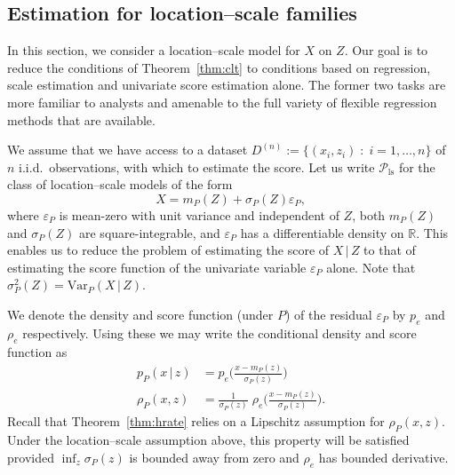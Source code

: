 \documentclass[aos]{imsart}
\newcommand{\R}{\mathbb{R}}
\newcommand{\Var}{\mathrm{Var}}
\newcommand{\given}{\,|\,}
\begin{document}
	
	
	\subsection{Estimation for location--scale families}
	\label{sect:scorelsfamilies}
	In this section, we consider  a location--scale model for $X$ on $Z$.
	Our goal is to reduce the conditions of Theorem~\ref{thm:clt} to conditions based on regression, scale estimation and univariate score estimation alone. The former two tasks are more familiar to analysts and amenable to the full variety of flexible regression methods that are available.
	
	
	We assume that we have access to a dataset $D^{(n)} := \{ (x_i,z_i) \;:\; i=1,\ldots,n\}$ of $n$ i.i.d.\ observations, with which to estimate the score.
	Let us write $\mathcal{P}_{\text{ls}}$ for the class of location--scale models of the form \begin{equation}
		X = m_P(Z) + \sigma_P(Z)\varepsilon_P, \label{eqn:locscale}
	\end{equation}
	where $\varepsilon_P$ is mean-zero with unit variance and independent of $Z$, both $m_P(Z)$ and $\sigma_P(Z)$ are square-integrable, and $\varepsilon_P$ has a differentiable density on $\R$. This enables us to reduce the problem of estimating the score of $X\given  Z$ to that of estimating the score function of the univariate variable $\varepsilon_P$ alone. Note that $\sigma_P^2(Z) = \Var_P(X \given Z)$.
	
	
	We denote the density and score function (under $P$) of the residual $\varepsilon_P$ by $p_{e}$ and $\rho_{e}$ respectively. Using these we may write the conditional density and score function as \begin{align*}
		p_P(x\given  z) &= p_{e}\bigg(\frac{x-m_P(z)}{\sigma_P(z)}\bigg)\\
		\rho_P(x, z) &= \frac{1}{\sigma_P(z)}\; \rho_{e}\bigg(\frac{x-m_P(z)}{\sigma_P(z)}\bigg).
	\end{align*}
	Recall that Theorem~\ref{thm:hrate} relies on a Lipschitz assumption for $\rho_P(x, z)$. Under the location--scale assumption above, this property will be satisfied provided $\inf_{z} \sigma_P(z)$ is bounded away from zero and $\rho_e$ has bounded derivative.
	
\end{document}
